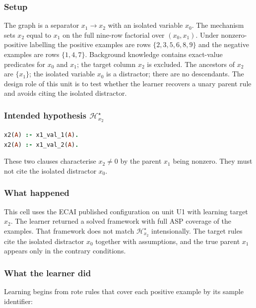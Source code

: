 \documentclass[11pt]{article}
\begin{document}
\subsubsection{Setup}

The graph is a separator \(x_1\to x_2\) with an isolated variable \(x_0\). The mechanism sets \(x_2\) equal to \(x_1\) on the full nine-row factorial over \((x_0,x_1)\). Under nonzero-positive labelling the positive examples are rows \(\{2,3,5,6,8,9\}\) and the negative examples are rows \(\{1,4,7\}\). Background knowledge contains exact-value predicates for \(x_0\) and \(x_1\); the target column \(x_2\) is excluded. The ancestors of \(x_2\) are \(\{x_1\}\); the isolated variable \(x_0\) is a distractor; there are no descendants. The design role of this unit is to test whether the learner recovers a unary parent rule and avoids citing the isolated distractor.

\subsubsection{\texorpdfstring{Intended hypothesis \(\mathcal{H}_{x_2}^\star\)}{Intended hypothesis H-star(x2)}}

\begin{lstlisting}[style=logic,language=Prolog]
x2(A) :- x1_val_1(A).
x2(A) :- x1_val_2(A).
\end{lstlisting}

These two clauses characterise \(x_2\neq 0\) by the parent \(x_1\) being nonzero. They must not cite the isolated distractor \(x_0\).

\subsubsection{What happened}

This cell uses the ECAI published configuration on unit U1 with learning target \(x_2\). The learner returned a solved framework with full ASP coverage of the examples. That framework does not match \(\mathcal{H}_{x_2}^\star\) intensionally. The target rules cite the isolated distractor \(x_0\) together with assumptions, and the true parent \(x_1\) appears only in the contrary conditions.

\subsubsection{What the learner did}

Learning begins from rote rules that cover each positive example by its sample identifier:
\end{document}
